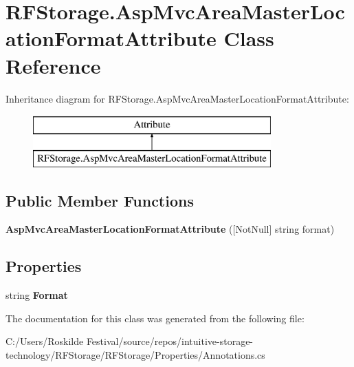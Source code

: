 \section{R\+F\+Storage.\+Asp\+Mvc\+Area\+Master\+Location\+Format\+Attribute Class Reference}
\label{class_r_f_storage_1_1_asp_mvc_area_master_location_format_attribute}
Inheritance diagram for R\+F\+Storage.\+Asp\+Mvc\+Area\+Master\+Location\+Format\+Attribute\+:\begin{figure}[H]
\begin{center}
\leavevmode
\includegraphics[height=2.000000cm]{class_r_f_storage_1_1_asp_mvc_area_master_location_format_attribute}
\end{center}
\end{figure}
\subsection*{Public Member Functions}
\begin{DoxyCompactItemize}
\item 
\mbox{\label{class_r_f_storage_1_1_asp_mvc_area_master_location_format_attribute_a742ef10ebbbe02b294b07c5ddc4c100b}} 
{\bfseries Asp\+Mvc\+Area\+Master\+Location\+Format\+Attribute} ([Not\+Null] string format)
\end{DoxyCompactItemize}
\subsection*{Properties}
\begin{DoxyCompactItemize}
\item 
\mbox{\label{class_r_f_storage_1_1_asp_mvc_area_master_location_format_attribute_aa73f868f6e2ed0e315dc153d70a597f7}} 
string {\bfseries Format}\hspace{0.3cm}{\ttfamily  [get]}
\end{DoxyCompactItemize}


The documentation for this class was generated from the following file\+:\begin{DoxyCompactItemize}
\item 
C\+:/\+Users/\+Roskilde Festival/source/repos/intuitive-\/storage-\/technology/\+R\+F\+Storage/\+R\+F\+Storage/\+Properties/Annotations.\+cs\end{DoxyCompactItemize}
